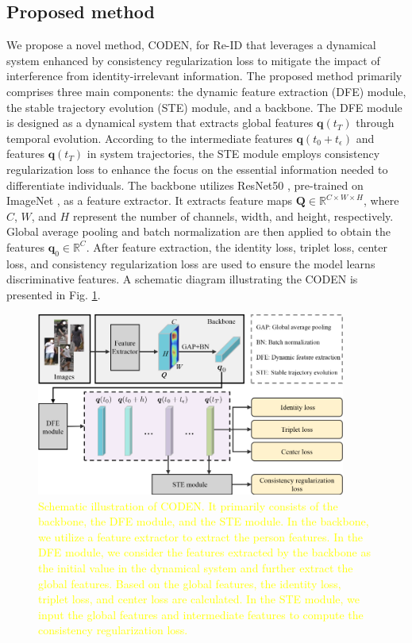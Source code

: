 \documentclass[12pt]{spieman}  %
\begin{document}
\begin{spacing}{2}
		\section{Proposed method} \label{section:proposed_method}
		We propose a novel method, CODEN, for Re-ID that leverages a dynamical system enhanced by consistency regularization loss to mitigate the impact of interference from identity-irrelevant information. The proposed method primarily comprises three main components: the dynamic feature extraction (DFE) module, the stable trajectory evolution (STE) module, and a backbone. The DFE module is designed as a dynamical system that extracts global features $\boldsymbol{q}(t_T)$ through temporal evolution. According to the intermediate features $\boldsymbol{q}(t_0 + t_\epsilon)$ and features $\boldsymbol{q}(t_T)$ in system trajectories, the STE module employs consistency regularization loss to enhance the focus on the essential information needed to differentiate individuals. The backbone utilizes ResNet50 \cite{he2016deep}, pre-trained on ImageNet \cite{russakovsky2015imagenet}, as a feature extractor. It extracts feature maps $\boldsymbol{Q} \in \mathbb{R}^{C \times W \times H}$, where $C$, $W$, and $H$ represent the number of channels, width, and height, respectively. Global average pooling and batch normalization are then applied to obtain the features $\boldsymbol{q}_0 \in \mathbb{R}^C$. After feature extraction, the identity loss, triplet loss, center loss, and consistency regularization loss are used to ensure the model learns discriminative features. A schematic diagram illustrating the CODEN is presented in Fig. \ref{fig:CODEN_framework}.
		
		\begin{figure}[!htbp]
			\centering
			\includegraphics[width=4.0in]{Figure_1}
			\caption{\textcolor{yellow}{Schematic illustration of CODEN. It primarily consists of the backbone, the DFE module, and the STE module. In the backbone, we utilize a feature extractor to extract the person features. In the DFE module, we consider the features extracted by the backbone as the initial value in the dynamical system and further extract the global features. Based on the global features, the identity loss, triplet loss, and center loss are calculated. In the STE module, we input the global features and intermediate features to compute the consistency regularization loss.}}
			\label{fig:CODEN_framework}
		\end{figure}
		

\end{spacing}
\end{document}
